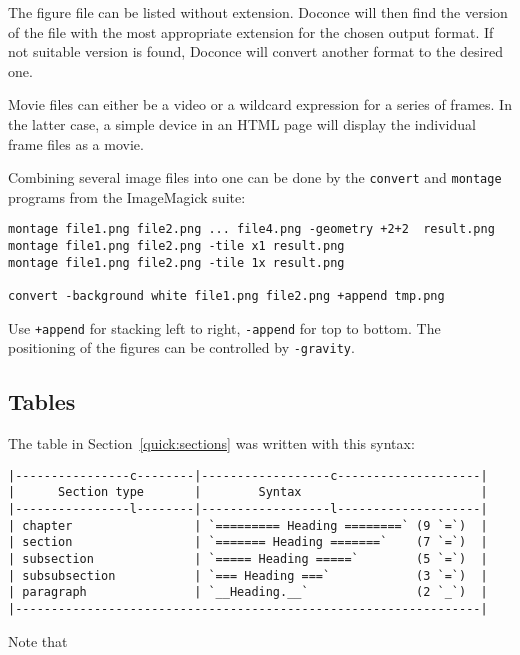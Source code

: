 \documentclass[%
oneside,                 %
final,                   %
10pt]{article}
\begin{document}
The figure file can be listed without extension. Doconce will then find
the version of the file with the most appropriate extension for the chosen
output format. If not suitable version is found, Doconce will convert
another format to the desired one.

Movie files can either be a video or a wildcard expression for a
series of frames. In the latter case, a simple device in an HTML page
will display the individual frame files as a movie.

Combining several image files into one can be done by the
\Verb!convert! and \Verb!montage! programs from the ImageMagick suite:
\begin{Verbatim}[numbers=none,fontsize=\fontsize{9pt}{9pt},baselinestretch=0.85,xleftmargin=0mm]
montage file1.png file2.png ... file4.png -geometry +2+2  result.png
montage file1.png file2.png -tile x1 result.png
montage file1.png file2.png -tile 1x result.png

convert -background white file1.png file2.png +append tmp.png
\end{Verbatim}
Use \Verb!+append! for stacking left to right, \Verb!-append! for top to bottom.
The positioning of the figures can be controlled by \Verb!-gravity!.

\subsection{Tables}

The table in Section~\ref{quick:sections} was written with this
syntax:
\begin{Verbatim}[numbers=none,fontsize=\fontsize{9pt}{9pt},baselinestretch=0.85,xleftmargin=0mm]
|----------------c--------|------------------c--------------------|
|      Section type       |        Syntax                         |
|----------------l--------|------------------l--------------------|
| chapter                 | `========= Heading ========` (9 `=`)  |
| section                 | `======= Heading =======`    (7 `=`)  |
| subsection              | `===== Heading =====`        (5 `=`)  |
| subsubsection           | `=== Heading ===`            (3 `=`)  |
| paragraph               | `__Heading.__`               (2 `_`)  |
|-----------------------------------------------------------------|
\end{Verbatim}

Note that
\end{document}
